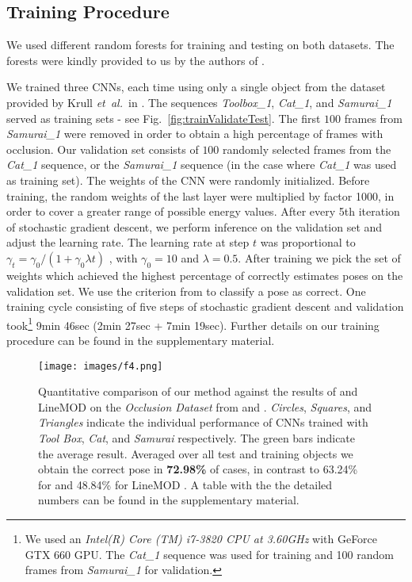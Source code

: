 \documentclass[10pt,letterpaper]{article}
\newcommand{\etal}{\mbox{\emph{et al.\ }}}
\begin{document}
\subsection{Training Procedure}
We used different random forests for training and testing on both datasets. The forests were kindly provided to us by the authors of \cite{brachmann2014}. 

We trained three CNNs, each time using only a single object from the dataset provided by Krull \etal in \cite{krull2014}. The sequences \emph{Toolbox\_1}, \emph{Cat\_1}, and \emph{Samurai\_1} served as training sets - see Fig.~\ref{fig:trainValidateTest}. The first $100$ frames from \emph{Samurai\_1} were removed in order to obtain a high percentage of frames with occlusion. Our validation set consists of $100$ randomly selected frames from the \emph{Cat\_1} sequence, or the \emph{Samurai\_1} sequence (in the case where \emph{Cat\_1} was used as training set).
The weights of the CNN were randomly initialized. Before training, the random weights of the last layer were multiplied by factor 1000, in order to cover a greater range of possible energy values.
After every 5th iteration of stochastic gradient descent, we perform inference on the validation set and  adjust the learning rate. The learning rate at step $t$ was proportional to $\gamma_t= \gamma_0 / (1+\gamma_0 \lambda t)$ \cite{bottou-tricks-2012}, with $\gamma_0=10$ and $\lambda=0.5$.
After training we pick the set of weights which achieved the highest percentage of correctly estimates poses on the validation set. We use the criterion from \cite{hinterstoisser2012accv} to classify a pose as correct. One training cycle consisting of five steps of stochastic gradient descent and validation took\footnote{We used an \emph{Intel(R) Core (TM) i7-3820 CPU at 3.60GHz} with GeForce GTX 660 GPU. The \emph{Cat\_1} sequence was used for training and 100 random frames from \emph{Samurai\_1} for validation.} 9min 46sec (2min 27sec + 7min 19sec).
Further details on our training procedure can be found in the supplementary material. 


\begin{figure}[!ht]
\begin{center}
\texttt{[image: images/f4.png]}
\end{center}
   \caption{Quantitative comparison of our method against the results of \cite{brachmann2014} and LineMOD \cite{hinterstoisser2012accv} on the \emph{Occlusion Dataset} from  \cite{brachmann2014} and \cite{hinterstoisser2012accv}. \emph{Circles}, \emph{Squares}, and \emph{Triangles} indicate the individual performance of CNNs trained with \emph{Tool Box}, \emph{Cat}, and \emph{Samurai} respectively. The green bars indicate the average result. Averaged over all test and training objects we obtain the correct pose in {\bf 72.98\%} of cases, in contrast to 63.24\% for \cite{brachmann2014} and 48.84\% for LineMOD \cite{hinterstoisser2012accv}. A table with the the detailed numbers can be found in the supplementary material.}
\label{fig:comp-eccv14}
\end{figure}
\end{document}
